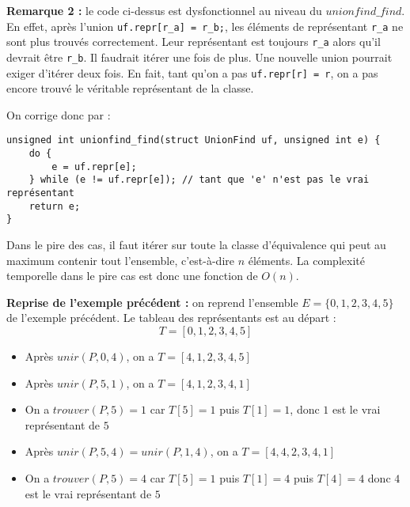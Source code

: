 \documentclass[../../../main.tex]{subfiles}
\begin{document}
\textbf{Remarque 2 :} le code ci-dessus est dysfonctionnel au niveau du $unionfind\_find$. En effet, après l'union \texttt{uf.repr[r_a] = r_b;}, les éléments de représentant \texttt{r_a} ne sont plus trouvés correctement. Leur représentant est toujours \texttt{r_a} alors qu'il devrait être \texttt{r_b}. Il faudrait itérer une fois de plus. Une nouvelle union pourrait exiger d'itérer deux fois. En fait, tant qu'on a pas \texttt{uf.repr[r] = r}, on a pas encore trouvé le véritable représentant de la classe.

On corrige donc par : 
\begin{verbatim}
unsigned int unionfind_find(struct UnionFind uf, unsigned int e) {
	do {
		e = uf.repr[e];
	} while (e != uf.repr[e]); // tant que 'e' n'est pas le vrai représentant
	return e;
}
\end{verbatim}
Dans le pire des cas, il faut itérer sur toute la classe d'équivalence qui peut au maximum contenir tout l'ensemble, c'est-à-dire $n$ éléments. La complexité temporelle dans le pire cas est donc une fonction de $O(n)$.

\textbf{Reprise de l'exemple précédent :} on reprend l'ensemble $E = \{0, 1, 2, 3, 4, 5\}$ de l'exemple précédent. Le tableau des représentants est au départ :
$$T = [0, 1, 2, 3, 4, 5]$$
\begin{itemize}
	\item Après $unir(P, 0, 4)$, on a $T = [4, 1, 2, 3, 4, 5]$
	\item Après $unir(P, 5, 1)$, on a $T = [4, 1, 2, 3, 4, 1]$
	\item On a $trouver(P, 5) = 1$ car $T[5] = 1$ puis $T[1] = 1$, donc $1$ est le vrai représentant de $5$
	\item Après $unir(P, 5, 4) = unir(P, 1, 4)$, on a $T = [4, 4, 2, 3, 4, 1]$
	\item On a $trouver(P, 5) = 4$ car $T[5] = 1$ puis $T[1] = 4$ puis $T[4] = 4$ donc $4$ est le vrai représentant de $5$
\end{itemize}
\end{document}
